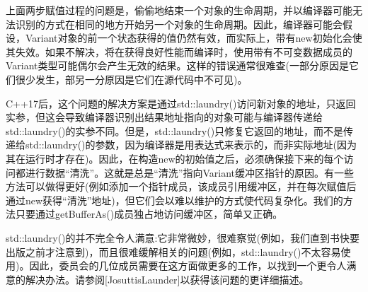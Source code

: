 上面两步赋值过程的问题是，偷偷地结束一个对象的生命周期，并以编译器可能无法识别的方式在相同的地方开始另一个对象的生命周期。因此，编译器可能会假设，Variant对象的前一个状态获得的值仍然有效，而实际上，带有new初始化会使其失效。如果不解决，将在获得良好性能而编译时，使用带有不可变数据成员的Variant类型可能偶尔会产生无效的结果。这样的错误通常很难查(一部分原因是它们很少发生，部另一分原因是它们在源代码中不可见)。

C++17后，这个问题的解决方案是通过std::laundry()访问新对象的地址，只返回实参，但这会导致编译器识别出结果地址指向的对象可能与编译器传递给std::laundry()的实参不同。但是，std::laundry()只修复它返回的地址，而不是传递给std::laundry()的参数，因为编译器是用表达式来表示的，而非实际地址(因为其在运行时才存在)。因此，在构造new的初始值之后，必须确保接下来的每个访问都进行数据“清洗”。这就是总是“清洗”指向Variant缓冲区指针的原因。有一些方法可以做得更好(例如添加一个指针成员，该成员引用缓冲区，并在每次赋值后通过new获得“清洗”地址)，但它们会以难以维护的方式使代码复杂化。我们的方法只要通过getBufferAs()成员独占地访问缓冲区，简单又正确。

std::laundry()的并不完全令人满意:它非常微妙，很难察觉(例如，我们直到书快要出版之前才注意到)，而且很难缓解相关的问题(例如，std::laundry()不太容易使用)。因此，委员会的几位成员需要在这方面做更多的工作，以找到一个更令人满意的解决办法。请参阅[JosuttisLaunder]以获得该问题的更详细描述。